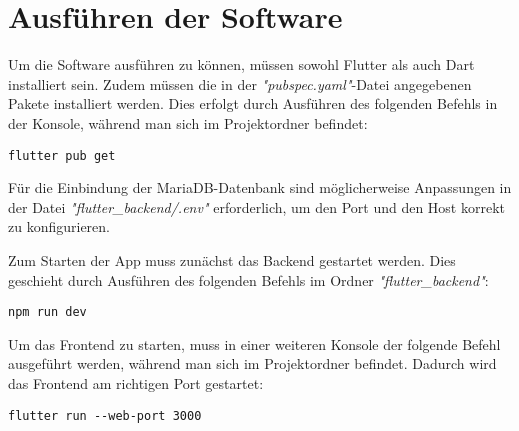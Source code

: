 \chapter{Ausführen der Software}

Um die Software ausführen zu können, müssen sowohl Flutter als auch Dart installiert sein. Zudem müssen die in der \textit{"pubspec.yaml"}-Datei angegebenen Pakete installiert werden. Dies erfolgt durch Ausführen des folgenden Befehls in der Konsole, während man sich im Projektordner befindet:
\newline
\begin{lstlisting}[caption={Installieren der benötigten Pakete}, label={lst:pubget}]
    flutter pub get
\end{lstlisting}

Für die Einbindung der MariaDB-Datenbank sind möglicherweise Anpassungen in der Datei \textit{"flutter\_backend/.env"} erforderlich, um den Port und den Host korrekt zu konfigurieren.

Zum Starten der App muss zunächst das Backend gestartet werden. Dies geschieht durch Ausführen des folgenden Befehls im Ordner \textit{"flutter\_backend"}:
\newline
\begin{lstlisting}[caption={Starten des Backends}, label={lst:backend}]
    npm run dev
\end{lstlisting}

Um das Frontend zu starten, muss in einer weiteren Konsole der folgende Befehl ausgeführt werden, während man sich im Projektordner befindet. Dadurch wird das Frontend am richtigen Port gestartet:
\newline
\begin{lstlisting}[caption={Starten des Frontends}, label={lst:frontend}]
    flutter run --web-port 3000
\end{lstlisting}
